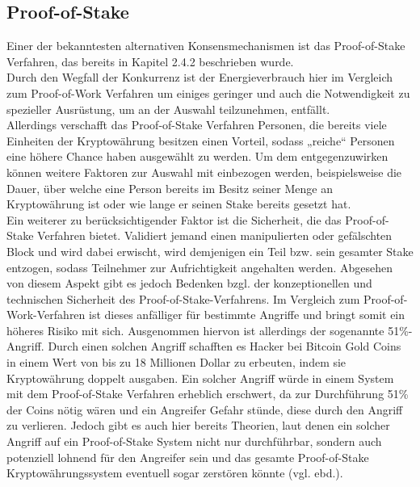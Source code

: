 \documentclass[12pt]{article}
\begin{document}
\subsection{Proof-of-Stake}
Einer der bekanntesten alternativen Konsensmechanismen ist das Proof-of-Stake Verfahren, das bereits in Kapitel 2.4.2 beschrieben wurde.\\
Durch den Wegfall der Konkurrenz ist der Energieverbrauch hier im Vergleich zum Proof-of-Work Verfahren um einiges geringer und auch die Notwendigkeit zu spezieller Ausrüstung, um an der Auswahl teilzunehmen, entfällt.\\
Allerdings verschafft das Proof-of-Stake Verfahren Personen, die bereits viele Einheiten der Kryptowährung besitzen einen Vorteil, sodass „reiche“ Personen eine höhere Chance haben ausgewählt zu werden. Um dem entgegenzuwirken können weitere Faktoren zur Auswahl mit einbezogen werden, beispielsweise die Dauer, über welche eine Person bereits im Besitz seiner Menge an Kryptowährung ist oder wie lange er seinen Stake bereits gesetzt hat.\\
Ein weiterer zu berücksichtigender Faktor ist die Sicherheit, die das Proof-of-Stake Verfahren bietet. Validiert jemand einen manipulierten oder gefälschten Block und wird dabei erwischt, wird demjenigen ein Teil bzw. sein gesamter Stake entzogen, sodass Teilnehmer zur Aufrichtigkeit angehalten werden. Abgesehen von diesem Aspekt gibt es jedoch Bedenken bzgl. der konzeptionellen und technischen Sicherheit des Proof-of-Stake-Verfahrens. Im Vergleich zum Proof-of-Work-Verfahren ist dieses anfälliger für bestimmte Angriffe und bringt somit ein höheres Risiko mit sich. Ausgenommen hiervon ist allerdings der sogenannte 51\%-Angriff. Durch einen solchen Angriff schafften es Hacker bei Bitcoin Gold Coins in einem Wert von bis zu 18 Millionen Dollar zu erbeuten, indem sie Kryptowährung doppelt ausgaben. Ein solcher Angriff würde in einem System mit dem Proof-of-Stake Verfahren erheblich erschwert, da zur Durchführung 51\% der Coins nötig wären und ein Angreifer Gefahr stünde, diese durch den Angriff zu verlieren. Jedoch gibt es auch hier bereits Theorien, laut denen ein solcher Angriff auf ein Proof-of-Stake System nicht nur durchführbar, sondern auch potenziell lohnend für den Angreifer sein und das gesamte Proof-of-Stake Kryptowährungssystem eventuell sogar zerstören könnte (vgl. ebd.).
\end{document}
